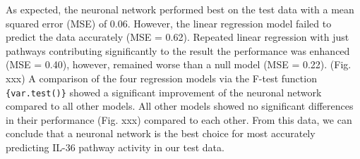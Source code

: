 \documentclass[
]{article}
\begin{document}
As expected, the neuronal network performed best on the test data with a
mean squared error (MSE) of 0.06. However, the linear regression model
failed to predict the data accurately (MSE = 0.62). Repeated linear
regression with just pathways contributing significantly to the result
the performance was enhanced (MSE = 0.40), however, remained worse than
a null model (MSE = 0.22). (Fig. xxx) A comparison of the four
regression models via the F-test function \texttt{\{var.test()\}} showed
a significant improvement of the neuronal network compared to all other
models. All other models showed no significant differences in their
performance (Fig. xxx) compared to each other. From this data, we can
conclude that a neuronal network is the best choice for most accurately
predicting IL-36 pathway activity in our test data.
\end{document}
